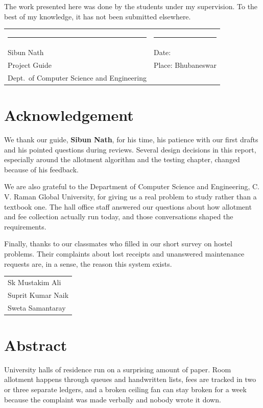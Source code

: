 \documentclass[11pt,a4paper]{report}
\begin{document}
The work presented here was done by the students under my supervision. To the best of my knowledge, it has not been submitted elsewhere.

\vspace{3cm}
\noindent\begin{tabular}{@{}p{7cm}p{7cm}@{}}
\rule{5cm}{0.4pt} & \rule{5cm}{0.4pt}\\
Sibun Nath & Date:\\
Project Guide & Place: Bhubaneswar\\
Dept.\ of Computer Science and Engineering & \\
\end{tabular}

\chapter*{Acknowledgement}
We thank our guide, \textbf{Sibun Nath}, for his time, his patience with our first drafts and his pointed questions during reviews. Several design decisions in this report, especially around the allotment algorithm and the testing chapter, changed because of his feedback.

We are also grateful to the Department of Computer Science and Engineering, C. V. Raman Global University, for giving us a real problem to study rather than a textbook one. The hall office staff answered our questions about how allotment and fee collection actually run today, and those conversations shaped the requirements.

Finally, thanks to our classmates who filled in our short survey on hostel problems. Their complaints about lost receipts and unanswered maintenance requests are, in a sense, the reason this system exists.

\vspace{2cm}
\hfill\begin{tabular}{l}
Sk Mustakim Ali\\ Suprit Kumar Naik\\ Sweta Samantaray
\end{tabular}

\chapter*{Abstract}
University halls of residence run on a surprising amount of paper. Room allotment happens through queues and handwritten lists, fees are tracked in two or three separate ledgers, and a broken ceiling fan can stay broken for a week because the complaint was made verbally and nobody wrote it down.
\end{document}
